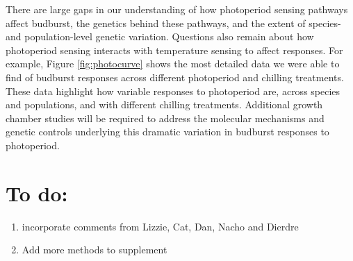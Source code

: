 \documentclass{article}
\begin{document}
\par There are large gaps in our understanding of how photoperiod sensing pathways affect budburst, the genetics behind these pathways, and the extent of species- and population-level genetic variation. Questions also remain about how photoperiod sensing interacts with temperature sensing to affect responses. For example, Figure \ref{fig:photocurve} shows the most detailed data we were able to find of budburst responses across different photoperiod and chilling treatments. These data highlight how variable responses to photoperiod are, across species and populations, and with different chilling treatments. Additional growth chamber studies will be required to address the molecular mechanisms and genetic controls underlying this dramatic variation in  budburst responses to photoperiod. 

\section* {To do:}
\begin{enumerate}
\item incorporate comments from Lizzie, Cat, Dan, Nacho and Dierdre
\item Add more methods to supplement
\end{enumerate}


\clearpage
\end{document}
